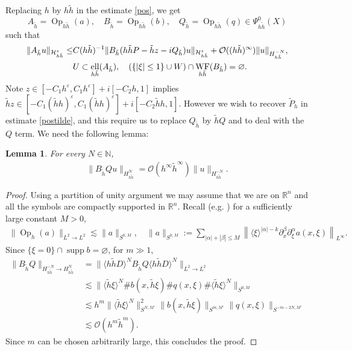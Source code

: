 \documentclass[reqno,12pt,letterpaper]{amsart}
\newtheorem{lem}[prop]{Lemma}
\numberwithin{equation}{section}
\numberwithin{prop}{section}
\DeclareMathOperator{\Op}{Op}
\DeclareMathOperator{\supp}{supp}
\DeclareMathOperator{\el}{ell}
\DeclareMathOperator{\WF}{WF}
\newcommand{\Ocal}{{\mathcal O}}
\begin{document}
Replacing $h$ by $h\tilde{h}$ in the estimate \eqref{pos}, we get 
$$A_{\tilde{h}}=\Op_{h\tilde{h}}(a),\quad B_{\tilde{h}}=\Op_{h\tilde{h}}(b),\quad Q_{\tilde{h}}=\Op_{h\tilde{h}}(q)\in\Psi^0_{h\tilde{h}}(X)$$
such that
\begin{align}
\label{postilde}
\begin{split}
        \|A_{\tilde{h}}u\|_{\mathcal{H}^s_{h\tilde{h}}}\leq& C(h\tilde{h})^{-1}\|B_{\tilde{h}}(h\tilde{h}P-\tilde{h}z-iQ_{\tilde{h}} )u\|_{\mathcal{H}^s_{h\tilde{h}}}+\mathcal{O}((h\tilde{h})^\infty)\|u\|_{H_{h\tilde{h}}^{-N}},\\
    &\begin{gathered}U\subset\el_{h\Tilde{h}}(A_{\tilde{h}}),\quad (\{|\xi|\leq 1\}\cup W)\cap \WF_{h\Tilde{h}}(B_{\tilde{h}})=\varnothing.\end{gathered}
\end{split}
\end{align}
Note $z\in [-C_1h^\varepsilon,C_1h^\varepsilon]+i[-C_2h,1]$ implies $\tilde{h}z\in [-C_1 (\tilde{h}h)^\varepsilon,C_1(\tilde{h}h)^\varepsilon]+i[-C_2\tilde{h}h,1]$. However we wish to recover $\widetilde{P}_h$ in estimate \eqref{postilde}, and this require us to replace $Q_{\tilde{h}}$ by $\tilde{h}Q$ and to deal with the $Q$ term. We need the following lemma:
\begin{lem}
For every $N\in\mathbb{N}$,
\begin{align*}
    \|B_{\tilde{h}}Qu\|_{H^N_{h\tilde{h}}}=\mathcal{O}(h^\infty \tilde{h}^\infty)\|u\|_{H^{-N}_{h\tilde{h}}}.
\end{align*}
\end{lem}
\begin{proof}
Using a partition of unity argument we may assume that we are on $\mathbb{R}^n$ and all the symbols are compactly supported in $\mathbb{R}^n$.
Recall (e.g. \cite[Theorem 4.23]{semibook}) for a sufficiently large constant $M>0$,
\begin{align*}
    \|\Op_h(a)\|_{L^2\to L^2}\lesssim \|a\|_{S^{0,M}},\quad \|a\|_{S^{k,M}}:=\sum\limits_{|\alpha|+|\beta|\leq M}\left\|\langle \xi\rangle^{|\alpha|-k}\partial^\beta_x\partial^\alpha_{\xi}a(x,\xi)\right\|_{L^\infty}.
\end{align*}
Since $\{\xi=0\}\cap\supp b=\varnothing$, for $m\gg 1$,
\begin{align*}
    \|B_{\tilde{h}}Q\|_{H^{-N}_{h\tilde{h}}\to H^N_{h\tilde{h}}}&=\|\langle h\tilde{h}D\rangle^N B_{\tilde{h}}Q\langle h\tilde{h}D\rangle^N\|_{L^2\to L^2}\\
    &\lesssim \|\langle \tilde{h}\xi\rangle^N\# b(x,\tilde{h}\xi)\# q(x,\xi)\# \langle \tilde{h}\xi\rangle^N\|_{S^{0,M}}\\
    &\lesssim h^m\|\langle \tilde{h}\xi\rangle^N\|^2_{S^{N,M'}} \|b(x,\tilde{h}\xi)\|_{S^{m,M'}} \|q(x,\xi)\|_{S^{-m-2N,M'}}\\
    &\lesssim \Ocal(h^m \tilde{h}^m).
\end{align*}
Since $m$ can be chosen arbitrarily large, this concludes the proof.
\end{proof}
\end{document}
